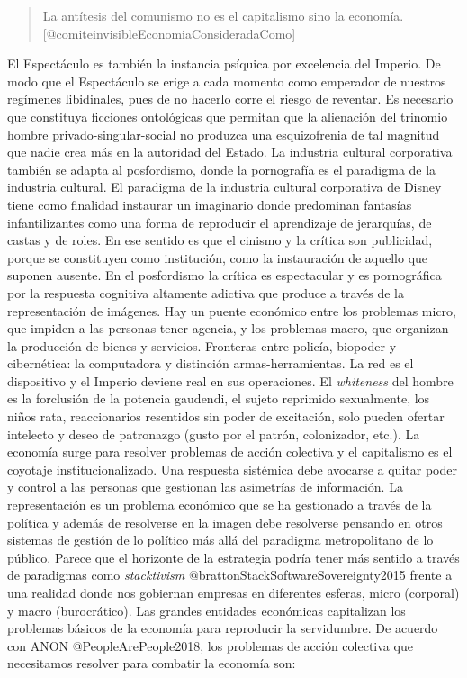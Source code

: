 \documentclass[
]{article}
\begin{document}
\begin{quote}
La antítesis del comunismo no es el capitalismo sino la economía.
{[}@comiteinvisibleEconomiaConsideradaComo{]}
\end{quote}

El Espectáculo es también la instancia psíquica por excelencia del
Imperio. De modo que el Espectáculo se erige a cada momento como
emperador de nuestros regímenes libidinales, pues de no hacerlo corre el
riesgo de reventar. Es necesario que constituya ficciones ontológicas
que permitan que la alienación del trinomio hombre
privado-singular-social no produzca una esquizofrenia de tal magnitud
que nadie crea más en la autoridad del Estado. La industria cultural
corporativa también se adapta al posfordismo, donde la pornografía es el
paradigma de la industria cultural. El paradigma de la industria
cultural corporativa de Disney tiene como finalidad instaurar un
imaginario donde predominan fantasías infantilizantes como una forma de
reproducir el aprendizaje de jerarquías, de castas y de roles. En ese
sentido es que el cinismo y la crítica son publicidad, porque se
constituyen como institución, como la instauración de aquello que
suponen ausente. En el posfordismo la crítica es espectacular y es
pornográfica por la respuesta cognitiva altamente adictiva que produce a
través de la representación de imágenes. Hay un puente económico entre
los problemas micro, que impiden a las personas tener agencia, y los
problemas macro, que organizan la producción de bienes y servicios.
Fronteras entre policía, biopoder y cibernética: la computadora y
distinción armas-herramientas. La red es el dispositivo y el Imperio
deviene real en sus operaciones. El \emph{whiteness} del hombre es la
forclusión de la potencia gaudendi, el sujeto reprimido sexualmente, los
niños rata, reaccionarios resentidos sin poder de excitación, solo
pueden ofertar intelecto y deseo de patronazgo (gusto por el patrón,
colonizador, etc.). La economía surge para resolver problemas de acción
colectiva y el capitalismo es el coyotaje institucionalizado. Una
respuesta sistémica debe avocarse a quitar poder y control a las
personas que gestionan las asimetrías de información. La representación
es un problema económico que se ha gestionado a través de la política y
además de resolverse en la imagen debe resolverse pensando en otros
sistemas de gestión de lo político más allá del paradigma metropolitano
de lo público. Parece que el horizonte de la estrategia podría tener más
sentido a través de paradigmas como \emph{stacktivism}
@brattonStackSoftwareSovereignty2015 frente a una realidad donde nos
gobiernan empresas en diferentes esferas, micro (corporal) y macro
(burocrático). Las grandes entidades económicas capitalizan los
problemas básicos de la economía para reproducir la servidumbre. De
acuerdo con ANON @PeopleArePeople2018, los problemas de acción colectiva
que necesitamos resolver para combatir la economía son:
\end{document}
